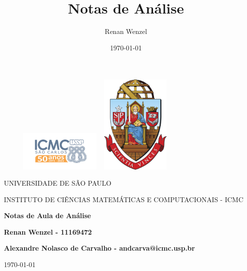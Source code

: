 \documentclass{article}
\title{Notas de An\'alise}
\author{Renan Wenzel}
\date{\today}
\begin{document}
\begin{figure}[ht]
	\includegraphics[width=4cm]{icmc.png}
	\hspace{7cm}
	\includegraphics[height=4.9cm,width=4cm]{brasao_usp_cor.jpg}
	\endminipage
\end{figure}

\begin{center}
	\vspace{1cm}
	\LARGE
	UNIVERSIDADE DE S\~AO PAULO

	\vspace{1.3cm}
	\LARGE
	INSTITUTO DE CI\^ENCIAS MATEM\'ATICAS E COMPUTACIONAIS - ICMC

	\vspace{1.7cm}
	\Large
	\textbf{Notas de Aula de An\'alise}

	\vspace{1.3cm}
	\large
	\textbf{Renan Wenzel - 11169472}

	\vspace{1.3cm}
	\large
	\textbf{Alexandre Nolasco de Carvalho - andcarva@icmc.usp.br}

	\vspace{1.3cm}
	\today
\end{center}

\newpage

\tableofcontents

\newpage


\newpage


\newpage


\newpage


\newpage


\newpage


\newpage
\end{document}
